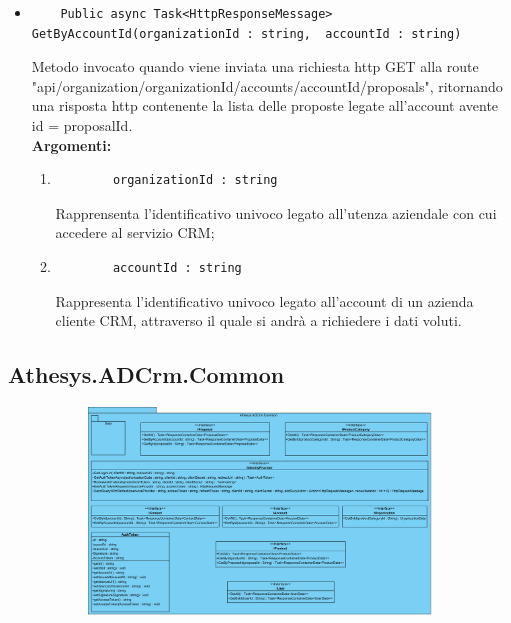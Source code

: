 \begin{itemize}
	\item 
	\begin{lstlisting}
	Public async Task<HttpResponseMessage> GetByAccountId(organizationId : string,  accountId : string)
	\end{lstlisting}
	Metodo invocato quando viene inviata una richiesta http GET alla route "api/organization/{organizationId}/accounts/{accountId}/proposals", ritornando una risposta http contenente la lista delle proposte legate all'account avente id = {proposalId}.\\
	\textbf{\small Argomenti:}
	\begin{enumerate}[leftmargin=*]
		\itemsep0em 
		\item 
		\begin{lstlisting}
		organizationId : string 
		\end{lstlisting}
		Rapprensenta l'identificativo univoco legato all'utenza aziendale con cui accedere al servizio CRM;
		\item 
		\begin{lstlisting}
		accountId : string
		\end{lstlisting}
		Rappresenta l'identificativo univoco legato all'account di un azienda cliente CRM, attraverso il quale si andrà a richiedere i dati voluti.
	\end{enumerate}
\end{itemize}



\vfill



\subsection{Athesys.ADCrm.Common}
\begin{figure}
	\begin{figure}[H]
		\centering
		\includegraphics[width=\linewidth]{images/modules/common}
		\caption{}
		\label{fig:common}
	\end{figure}
\end{figure}

